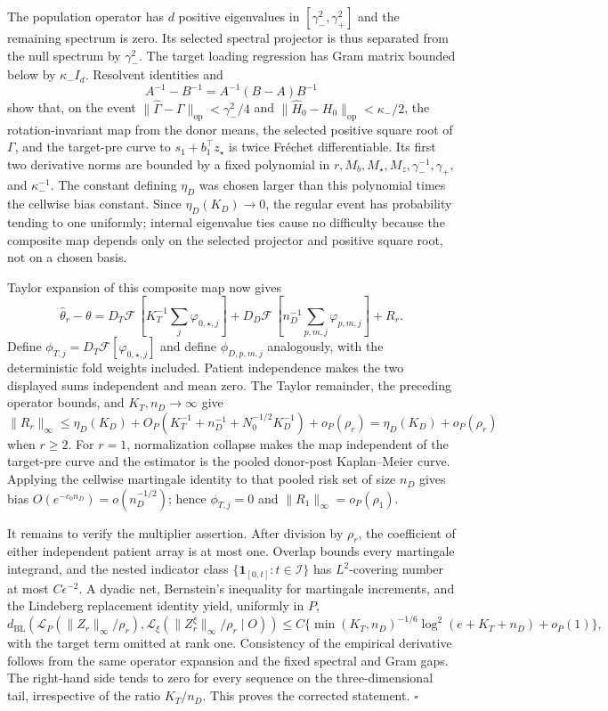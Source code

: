 The population operator has \(d\) positive eigenvalues in \([\gamma_-^2,\gamma_+^2]\) and the remaining spectrum is zero.  Its selected spectral projector is thus separated from the null spectrum by \(\gamma_-^2\).  The target loading regression has Gram matrix bounded below by \(\kappa_-I_d\).  Resolvent identities and
\[
 A^{-1}-B^{-1}=A^{-1}(B-A)B^{-1}
\]
show that, on the event \(\|\widehat\Gamma-\Gamma\|_{\mathrm{op}}<\gamma_-^2/4\) and \(\|\widehat H_0-H_0\|_{\mathrm{op}}<\kappa_-/2\), the rotation-invariant map from the donor means, the selected positive square root of \(\Gamma\), and the target-pre curve to \(s_1+b_1^\top z_\star\) is twice Fréchet differentiable.  Its first two derivative norms are bounded by a fixed polynomial in \(r,M_b,M_\star,M_z,\gamma_-^{-1},\gamma_+\), and \(\kappa_-^{-1}\).  The constant defining \(\eta_D\) was chosen larger than this polynomial times the cellwise bias constant.  Since \(\eta_D(K_D)\to0\), the regular event has probability tending to one uniformly; internal eigenvalue ties cause no difficulty because the composite map depends only on the selected projector and positive square root, not on a chosen basis.

Taylor expansion of this composite map now gives
\[
 \widehat\theta_r-\theta
 =D_T\mathcal F\,[K_T^{-1}\textstyle\sum_j\varphi_{0,\star,j}]
 +D_D\mathcal F\,[n_D^{-1}\textstyle\sum_{p,m,j}\varphi_{p,m,j}]+R_r.
\]
Define \(\phi_{T,j}=D_T\mathcal F[\varphi_{0,\star,j}]\) and define \(\phi_{D,p,m,j}\) analogously, with the deterministic fold weights included.  Patient independence makes the two displayed sums independent and mean zero.  The Taylor remainder, the preceding operator bounds, and \(K_T,n_D\to\infty\) give
\[
 \|R_r\|_\infty
 \le\eta_D(K_D)+O_P(K_T^{-1}+n_D^{-1}+N_0^{-1/2}K_D^{-1})+o_P(\rho_r)
 =\eta_D(K_D)+o_P(\rho_r)
\]
when \(r\ge2\).  For \(r=1\), normalization collapse makes the map independent of the target-pre curve and the estimator is the pooled donor-post Kaplan--Meier curve.  Applying the cellwise martingale identity to that pooled risk set of size \(n_D\) gives bias \(O(e^{-c_0n_D})=o(n_D^{-1/2})\); hence \(\phi_{T,j}=0\) and \(\|R_1\|_\infty=o_P(\rho_1)\).

It remains to verify the multiplier assertion.  After division by \(\rho_r\), the coefficient of either independent patient array is at most one.  Overlap bounds every martingale integrand, and the nested indicator class \(\{\mathbf 1_{[0,t]}:t\in\mathcal I\}\) has \(L^2\)-covering number at most \(C\epsilon^{-2}\).  A dyadic net, Bernstein's inequality for martingale increments, and the Lindeberg replacement identity yield, uniformly in \(P\),
\[
 d_{\mathrm{BL}}\!\left(
 \mathcal L_P(\|Z_r\|_\infty/\rho_r),
 \mathcal L_\xi(\|Z_r^\xi\|_\infty/\rho_r\mid O)
 \right)
 \le C\{\min(K_T,n_D)^{-1/6}\log^2(e+K_T+n_D)+o_P(1)\},
\]
with the target term omitted at rank one.  Consistency of the empirical derivative follows from the same operator expansion and the fixed spectral and Gram gaps.  The right-hand side tends to zero for every sequence on the three-dimensional tail, irrespective of the ratio \(K_T/n_D\).  This proves the corrected statement. \(\square\)